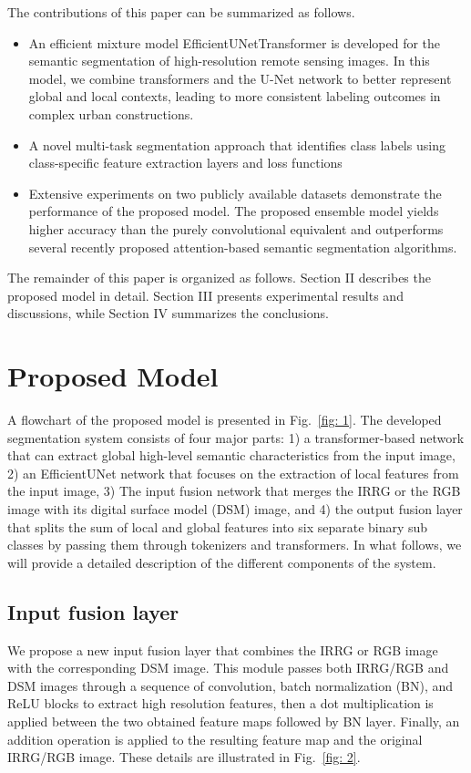 \documentclass[journal]{IEEEtran}
\begin{document}
The contributions of this paper can be summarized as follows.
\begin{itemize}
  \item An efficient mixture model EfficientUNetTransformer is developed for the semantic segmentation of high-resolution remote sensing images. In this model, we combine transformers and the U-Net network to better represent global and local contexts, leading to more consistent labeling outcomes in complex urban constructions.
  \item	A novel multi-task segmentation approach that identifies class labels using class-specific feature extraction layers and loss functions
  \item	Extensive experiments on two publicly available datasets demonstrate the performance of the proposed model. The proposed ensemble model yields higher accuracy than the purely convolutional equivalent and outperforms several recently proposed attention-based semantic segmentation algorithms.
\end{itemize}
The remainder of this paper is organized as follows. Section II describes the proposed model in detail. Section III presents experimental results and discussions, while Section IV summarizes the conclusions.



\section{Proposed Model}
A flowchart of the proposed model is presented in Fig.~\ref{fig: 1}. The developed segmentation system consists of four major parts: 1) a transformer-based network that can extract global high-level semantic characteristics from the input image, 2) an EfficientUNet network that focuses on the extraction of local features from the input image, 3) The input fusion network that merges the IRRG or the RGB image with its digital surface model (DSM) image, and 4) the output fusion layer that splits the sum of local and global features into six separate binary sub classes by passing them through tokenizers and transformers. In what follows, we will provide a detailed description of the different components of the system. 

\subsection{Input fusion layer}
We propose a new input fusion layer that combines the IRRG or RGB image with the corresponding DSM image. This module passes both IRRG/RGB and DSM images through a sequence of convolution, batch normalization (BN), and ReLU blocks to extract high resolution features, then a dot multiplication is applied between the two obtained feature maps followed by BN layer. Finally, an addition operation is applied to the resulting feature map and the original IRRG/RGB image. These details are illustrated in Fig.~\ref{fig: 2}.
\end{document}
